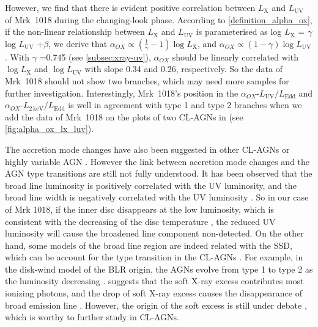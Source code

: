 \documentclass[twocolumn]{aastex63}
\newcommand{\alphaox}{$\alpha_{OX}$}
\begin{document}
 However, we find that there is evident positive correlation between $L_\mathrm{X}$ and $L_\mathrm{UV}$ of Mrk~1018 during the changing-look phase. According to \autoref{definition_alpha_ox}, if the non-linear relationship between $ L_{\mathrm{X}}$ and $ L_\mathrm{UV}$ is parameterised as log $L_\mathrm{X}$ = $\gamma $ log $L_{\mathrm{UV}} $ +$\beta$, we derive that $\alpha_{OX}\propto (\frac{1}{\gamma}-1) \log L_\mathrm{X}$, and $\alpha_{OX}\propto (1-\gamma) \log L_\mathrm{UV}$. With $\gamma$ =0.745 (see \autoref{subsec:xray-uv}), $\alpha_{OX}$ should be linearly correlated with $\log L_\mathrm{X}$ and $\log L_\mathrm{UV}$ with slope 0.34 and 0.26, respectively. So the data of Mrk~1018 should not show two branches, which may need more samples for further investigation. Interestingly, Mrk~1018's position in the \alphaox-$L_\mathrm{UV}/L_\mathrm{Edd}$ and \alphaox-$L_\mathrm{2\,keV}/L_\mathrm{Edd}$ is well in agreement with type 1 and type 2 branches when we add the data of Mrk~1018 on the plots of two CL-AGNs in \citet{2019arXiv190904676R} (see \autoref{fig:alpha_ox_lx_luv}).
 




The accretion mode changes have also been suggested in other CL-AGNs or highly variable AGN \citep{2019arXiv191203972L,2020ApJ...890L..29A,2020MNRAS.492.2335L}. However the link between accretion mode changes and the AGN type transitions are still not fully understood. It has been observed that the broad line luminosity is positively correlated with the UV luminosity, and the broad line width is negatively correlated with the UV luminosity \citep[e.g.][]{2019ApJ...885...44D}. So in our case of Mrk 1018, if the inner disc disappears at the low luminosity, which is consistent with the decreasing of the disc temperature \citep[see also ][]{2018MNRAS.480.3898N}, the reduced UV luminosity will cause the broadened line component non-detected. On the other hand, some models of the broad line region are indeed related with the SSD, which can be account for the type transition in the CL-AGNs \citep[see a recent review in ][]{2019OAst...28..200C}. For example, in the disk-wind model of the BLR origin, the AGNs evolve from type 1 to type 2 as the luminosity decreasing \citet[see][]{2014MNRAS.438.3340E}. \citet{2018MNRAS.480.3898N} suggests that the soft X-ray excess contributes most ionizing photons, and the drop of soft X-ray excess causes the disappearance of broad emission line \citep[see also in ][]{2020MNRAS.492.2335L}. However, the origin of the soft excess is still under debate \citep[e.g.][]{2018A&A...611A..59P}, which is worthy to further study in CL-AGNs. 
\end{document}
